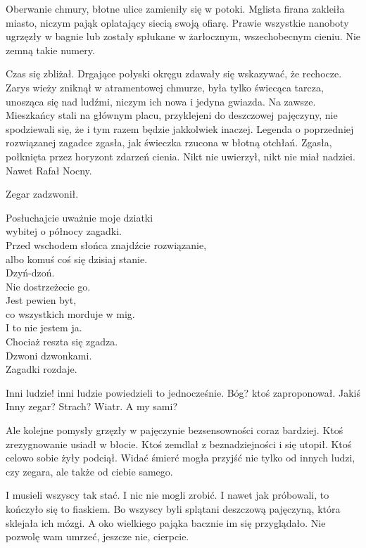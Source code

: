 Oberwanie chmury, błotne ulice zamieniły się w potoki.
Mglista firana zakleiła miasto, niczym pająk oplatający siecią swoją ofiarę.
Prawie wszystkie nanoboty ugrzęzły w bagnie lub zostały spłukane w żarłocznym, wszechobecnym cieniu.
Nie zemną takie numery.

Czas się zbliżał.
Drgające połyski okręgu zdawały się wskazywać, że rechocze.
Zarys wieży zniknął w atramentowej chmurze, była tylko świecąca tarcza, unosząca się nad ludźmi, niczym ich nowa i jedyna gwiazda.
Na zawsze.
Mieszkańcy stali na głównym placu, przyklejeni do deszczowej pajęczyny, nie spodziewali się, że i tym razem będzie jakkolwiek inaczej.
Legenda o poprzedniej rozwiązanej zagadce zgasła, jak świeczka rzucona w błotną otchłań. 
Zgasła, połknięta przez horyzont zdarzeń cienia.
Nikt nie uwierzył, nikt nie miał nadziei.
Nawet Rafał Nocny.

Zegar zadzwonił.

\begin{poem}
	Posłuchajcie uważnie moje dziatki \\
	wybitej o północy zagadki. \\
	Przed wschodem słońca znajdźcie rozwiązanie, \\
	albo komuś coś się dzisiaj stanie. \\
	Dzyń-dzoń. \\
	Nie dostrzeżecie go. \\
	Jest pewien byt, \\
	co wszystkich morduje w mig. \\
	I to nie jestem ja. \\
	Chociaż reszta się zgadza. \\
	Dzwoni dzwonkami. \\
	Zagadki rozdaje. \\
\end{poem}

\begin{dialogue}
	\ds{} Inni ludzie! \dm{} inni ludzie powiedzieli to jednocześnie.
	\ds{} Bóg? \dm{} ktoś zaproponował.
	\ds{} Jakiś Inny zegar?
	\ds{} Strach?
	\ds{} Wiatr.
	\ds{} A my sami?
\end{dialogue}
Ale kolejne pomysły grzęzły w pajęczynie bezsensowności coraz bardziej.
Ktoś zrezygnowanie usiadł w błocie.
Ktoś zemdlał z beznadziejności i się utopił.
Ktoś celowo sobie żyły podciął.
Widać śmierć mogła przyjść nie tylko od innych ludzi, czy zegara, ale także od ciebie samego.

I musieli wszyscy tak stać.
I nic nie mogli zrobić.
I nawet jak próbowali, to kończyło się to fiaskiem.
Bo wszyscy byli splątani deszczową pajęczyną, która sklejała ich mózgi.
A oko wielkiego pająka bacznie im się przyglądało.
Nie pozwolę wam umrzeć, jeszcze nie, cierpcie.

